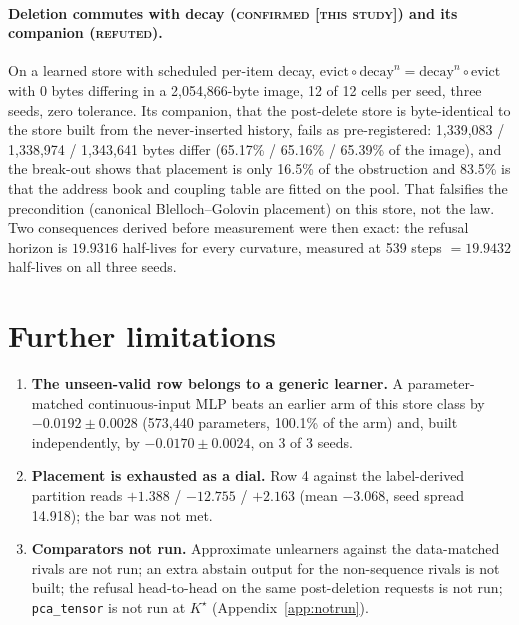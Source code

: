 \documentclass{article} %
\newcommand{\Kstar}{\ensuremath{K^{\star}}}
\begin{document}
\paragraph{Deletion commutes with decay (\textsc{confirmed [this study]}) and its companion
(\textsc{refuted}).} On a learned store with scheduled per-item decay,
$\text{evict}\circ\text{decay}^n=\text{decay}^n\circ\text{evict}$ with 0 bytes differing in a
2,054,866-byte image, 12 of 12 cells per seed, three seeds, zero tolerance.
Its companion, that the post-delete store is byte-identical to the store built from the
never-inserted history, fails as pre-registered: 1,339,083 / 1,338,974 / 1,343,641 bytes differ
(65.17\% / 65.16\% / 65.39\% of the image), and the break-out shows that placement is only 16.5\%
of the obstruction and 83.5\% is that the address book and coupling table are fitted on the pool.
That falsifies the precondition (canonical Blelloch--Golovin placement) on this store, not the
law. Two consequences derived before measurement were then exact: the refusal horizon is $19.9316$
half-lives for every curvature, measured at 539 steps $=19.9432$ half-lives on all three seeds.


\section{Further limitations}
\label{app:morelimits}
\begin{enumerate}[leftmargin=*,itemsep=1pt]
\item \textbf{The unseen-valid row belongs to a generic learner.} A parameter-matched
  continuous-input MLP beats an earlier arm of this store class by $-0.0192\pm0.0028$ (573,440
  parameters, 100.1\% of the arm) and, built independently, by $-0.0170\pm0.0024$, on 3 of 3
  seeds. %
\item \textbf{Placement is exhausted as a dial.} Row 4 against the label-derived partition reads
  $+1.388$ / $-12.755$ / $+2.163$ (mean $-3.068$, seed spread 14.918); the bar was not met.
\item \textbf{Comparators not run.} Approximate unlearners against the data-matched rivals are not
  run; an extra abstain output for the non-sequence rivals is not built; the refusal head-to-head on
  the same post-deletion requests is not run; \texttt{pca\_tensor} is not run at $\Kstar$
  (Appendix~\ref{app:notrun}).
\end{enumerate}
\end{document}
